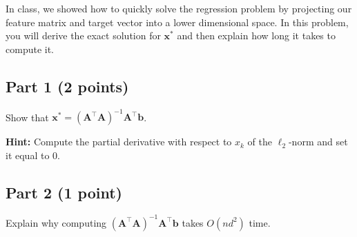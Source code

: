 \documentclass{article}
\begin{document}
In class, we showed how to quickly solve the regression problem by projecting our feature matrix and target vector into a lower dimensional space.
In this problem, you will derive the exact solution for $\mathbf{x}^*$ and then explain how long it takes to compute it.

\subsection*{Part 1 (2 points)}

Show that $\mathbf{x}^* = \left(\mathbf{A}^\top \mathbf{A} \right)^{-1} \mathbf{A}^\top \mathbf{b}$.

\textbf{Hint:} Compute the partial derivative with respect to $x_k$ of the $\ell_2$-norm and set it equal to 0.

\subsection*{Part 2 (1 point)}

Explain why computing $\left(\mathbf{A}^\top \mathbf{A} \right)^{-1} \mathbf{A}^\top \mathbf{b}$ takes $O(nd^2)$ time.

%
\end{document}

